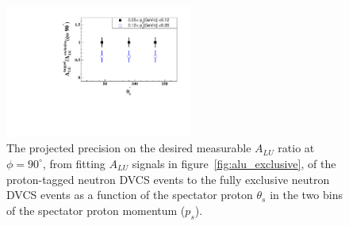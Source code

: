 \begin{figure}[htb]
  \centering
\includegraphics[width=0.55\textwidth,clip,trim=0mm 0mm 0mm 
   0mm]{figs_epngamma/pdf/ALU_ratio.pdf}
  \caption{The projected precision on the desired measurable $A_{LU}$ ratio at 
   $\phi = 90^{\circ}$, from fitting $A_{LU}$ signals in 
   figure~\ref{fig:alu_exclusive}, of the proton-tagged neutron DVCS events to 
   the fully exclusive neutron DVCS events as a function of the spectator 
   proton $\theta_s$ in the two bins of the spectator proton momentum ($p_s$).
   \label{fig:alu_ratio}}
\end{figure}



